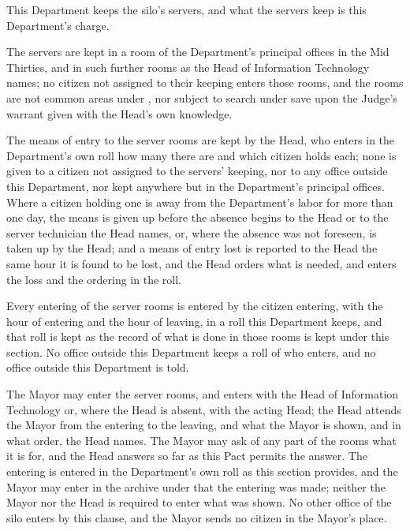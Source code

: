 This Department keeps the silo's servers, and what the servers keep is this Department's charge.

\begin{clauses}
\item The servers are kept in a room of the Department's principal offices in the Mid Thirties, and in such further rooms as the Head of Information Technology names; no citizen not assigned to their keeping enters those rooms, and the rooms are not common areas under , nor subject to search under  save upon the Judge's warrant given with the Head's own knowledge.
\item The means of entry to the server rooms are kept by the Head, who enters in the Department's own roll how many there are and which citizen holds each; none is given to a citizen not assigned to the servers' keeping, nor to any office outside this Department, nor kept anywhere but in the Department's principal offices. Where a citizen holding one is away from the Department's labor for more than one day, the means is given up before the absence begins to the Head or to the server technician the Head names, or, where the absence was not foreseen, is taken up by the Head; and a means of entry lost is reported to the Head the same hour it is found to be lost, and the Head orders what is needed, and enters the loss and the ordering in the roll.
\item Every entering of the server rooms is entered by the citizen entering, with the hour of entering and the hour of leaving, in a roll this Department keeps, and that roll is kept as the record of what is done in those rooms is kept under this section. No office outside this Department keeps a roll of who enters, and no office outside this Department is told.
\item The Mayor may enter the server rooms, and enters with the Head of Information Technology or, where the Head is absent, with the acting Head; the Head attends the Mayor from the entering to the leaving, and what the Mayor is shown, and in what order, the Head names. The Mayor may ask of any part of the rooms what it is for, and the Head answers so far as this Pact permits the answer. The entering is entered in the Department's own roll as this section provides, and the Mayor may enter in the archive under  that the entering was made; neither the Mayor nor the Head is required to enter what was shown. No other office of the silo enters by this clause, and the Mayor sends no citizen in the Mayor's place.

\end{clauses}
